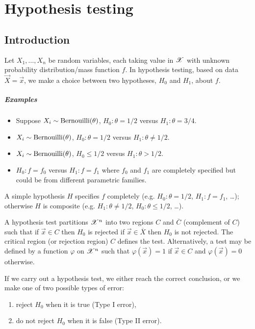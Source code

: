 
\chapter{Hypothesis testing}

\section{Introduction}

Let $X_1, \dotsc, X_n$ be \iid random variables, each taking value in $\mathscr{X}$ with unknown probability distribution/mass function $f$.
In hypothesis testing, based on data $\vec{X} = \vec{x}$, we make a choice between two hypotheses, $H_0$ and $H_1$, about $f$.

\paragraph{Examples}
\begin{itemize}
\item Suppose $X_i \sim \text{Bernouilli}(\theta)$, $H_0 : \theta = 1/2$ versus $H_1 : \theta = 3/4$.
\item $X_i \sim \text{Bernouilli}(\theta)$, $H_0 : \theta = 1/2$ versus $H_1 : \theta \neq 1/2$.
\item $X_i \sim \text{Bernouilli}(\theta)$, $H_0 \leq 1/2$ versus $H_1 : \theta > 1/2$.
\item $H_0 : f = f_0$ versus $H_1 : f = f_1$ where $f_0$ and $f_1$ are completely specified but could be from different parametric families.
\end{itemize}

A simple hypothesis $H$ specifies $f$ completely (e.g. $H_0 : \theta = 1/2$, $H_1 : f = f_1$, \dots); otherwise $H$ is composite (e.g. $H_1 : \theta \neq 1/2$, $H_0 : \theta \leq 1/2$, \dots).

A hypothesis test partitions $\mathscr{X}^n$ into two regions $C$ and $\overline{C}$ (complement of $C$) such that if $\vec{x} \in C$ then $H_0$ is rejected if $\vec{x} \in \overline{X}$ then $H_0$ is not rejected.
The critical region (or rejection region) $C$ defines the test.
Alternatively, a test may be defined by a function $\varphi$ on $\mathscr{X}^n$ such that $\varphi(\vec{x}) = 1$ if $\vec{x} \in C$ and $\varphi(\vec{x}) = 0$ otherwise.

If we carry out a hypothesis test, we either reach the correct conclusion, or we make one of two possible types of error:
\begin{enumerate}
\item reject $H_0$ when it is true (Type I error),
\item do not reject $H_0$ when it is false (Type II error).
\end{enumerate}

